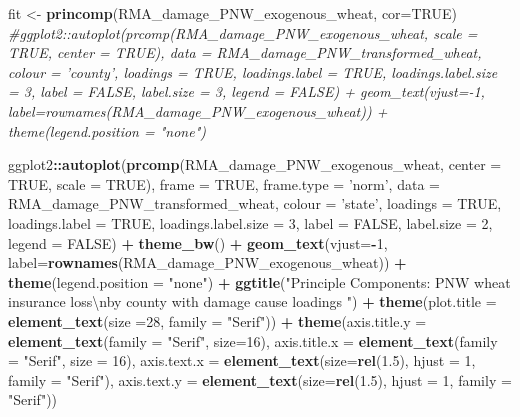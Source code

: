 \documentclass[]{article}
\newenvironment{Shaded}{\begin{snugshade}}{\end{snugshade}}
\newcommand{\CharTok}[1]{\textcolor[rgb]{0.31,0.60,0.02}{#1}}
\newcommand{\CommentTok}[1]{\textcolor[rgb]{0.56,0.35,0.01}{\textit{#1}}}
\newcommand{\DataTypeTok}[1]{\textcolor[rgb]{0.13,0.29,0.53}{#1}}
\newcommand{\DecValTok}[1]{\textcolor[rgb]{0.00,0.00,0.81}{#1}}
\newcommand{\FloatTok}[1]{\textcolor[rgb]{0.00,0.00,0.81}{#1}}
\newcommand{\KeywordTok}[1]{\textcolor[rgb]{0.13,0.29,0.53}{\textbf{#1}}}
\newcommand{\NormalTok}[1]{#1}
\newcommand{\OperatorTok}[1]{\textcolor[rgb]{0.81,0.36,0.00}{\textbf{#1}}}
\newcommand{\OtherTok}[1]{\textcolor[rgb]{0.56,0.35,0.01}{#1}}
\newcommand{\StringTok}[1]{\textcolor[rgb]{0.31,0.60,0.02}{#1}}
\begin{document}
\begin{Shaded}
\begin{Highlighting}[]
\NormalTok{fit <-}\StringTok{ }\KeywordTok{princomp}\NormalTok{(RMA_damage_PNW_exogenous_wheat, }\DataTypeTok{cor=}\OtherTok{TRUE}\NormalTok{)}
\CommentTok{#ggplot2::autoplot(prcomp(RMA_damage_PNW_exogenous_wheat, scale = TRUE, center = TRUE), data = RMA_damage_PNW_transformed_wheat, colour = 'county', loadings = TRUE, loadings.label = TRUE, loadings.label.size  = 3, label = FALSE, label.size = 3, legend = FALSE) + geom_text(vjust=-1, label=rownames(RMA_damage_PNW_exogenous_wheat)) + theme(legend.position = "none")}

\NormalTok{ggplot2}\OperatorTok{::}\KeywordTok{autoplot}\NormalTok{(}\KeywordTok{prcomp}\NormalTok{(RMA_damage_PNW_exogenous_wheat, }\DataTypeTok{center =} \OtherTok{TRUE}\NormalTok{, }\DataTypeTok{scale =} \OtherTok{TRUE}\NormalTok{), }\DataTypeTok{frame =} \OtherTok{TRUE}\NormalTok{, }\DataTypeTok{frame.type =} \StringTok{'norm'}\NormalTok{, }\DataTypeTok{data =}\NormalTok{ RMA_damage_PNW_transformed_wheat, }\DataTypeTok{colour =} \StringTok{'state'}\NormalTok{, }\DataTypeTok{loadings =} \OtherTok{TRUE}\NormalTok{, }\DataTypeTok{loadings.label =} \OtherTok{TRUE}\NormalTok{, }\DataTypeTok{loadings.label.size  =} \DecValTok{3}\NormalTok{, }\DataTypeTok{label =} \OtherTok{FALSE}\NormalTok{, }\DataTypeTok{label.size =} \DecValTok{2}\NormalTok{, }\DataTypeTok{legend =} \OtherTok{FALSE}\NormalTok{)  }\OperatorTok{+}\StringTok{ }\KeywordTok{theme_bw}\NormalTok{()   }\OperatorTok{+}\StringTok{ }\KeywordTok{geom_text}\NormalTok{(}\DataTypeTok{vjust=}\OperatorTok{-}\DecValTok{1}\NormalTok{, }\DataTypeTok{label=}\KeywordTok{rownames}\NormalTok{(RMA_damage_PNW_exogenous_wheat)) }\OperatorTok{+}\StringTok{ }\KeywordTok{theme}\NormalTok{(}\DataTypeTok{legend.position =} \StringTok{"none"}\NormalTok{) }\OperatorTok{+}\StringTok{ }\KeywordTok{ggtitle}\NormalTok{(}\StringTok{"Principle Components: PNW wheat insurance loss}\CharTok{\textbackslash{}n}\StringTok{by county with damage cause loadings "}\NormalTok{) }\OperatorTok{+}\StringTok{ }\KeywordTok{theme}\NormalTok{(}\DataTypeTok{plot.title =} \KeywordTok{element_text}\NormalTok{(}\DataTypeTok{size =}\DecValTok{28}\NormalTok{, }\DataTypeTok{family =} \StringTok{"Serif"}\NormalTok{)) }\OperatorTok{+}\StringTok{ }\KeywordTok{theme}\NormalTok{(}\DataTypeTok{axis.title.y =} \KeywordTok{element_text}\NormalTok{(}\DataTypeTok{family =} \StringTok{"Serif"}\NormalTok{, }\DataTypeTok{size=}\DecValTok{16}\NormalTok{), }\DataTypeTok{axis.title.x =} \KeywordTok{element_text}\NormalTok{(}\DataTypeTok{family =} \StringTok{"Serif"}\NormalTok{, }\DataTypeTok{size =} \DecValTok{16}\NormalTok{), }\DataTypeTok{axis.text.x =} \KeywordTok{element_text}\NormalTok{(}\DataTypeTok{size=}\KeywordTok{rel}\NormalTok{(}\FloatTok{1.5}\NormalTok{), }\DataTypeTok{hjust =} \DecValTok{1}\NormalTok{, }\DataTypeTok{family =} \StringTok{"Serif"}\NormalTok{), }\DataTypeTok{axis.text.y =} \KeywordTok{element_text}\NormalTok{(}\DataTypeTok{size=}\KeywordTok{rel}\NormalTok{(}\FloatTok{1.5}\NormalTok{), }\DataTypeTok{hjust =} \DecValTok{1}\NormalTok{, }\DataTypeTok{family =} \StringTok{"Serif"}\NormalTok{))}
\end{Highlighting}
\end{Shaded}
\end{document}
